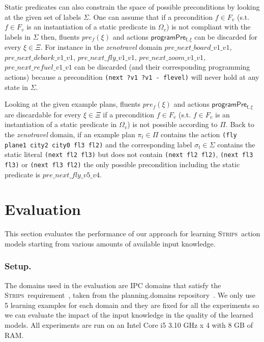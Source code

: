 \documentclass[letterpaper]{article} %
\newcommand{\strips}{\textsc{Strips}}     %
\begin{document}
Static predicates can also constrain the space of possible preconditions by looking at the given set of labels $\Sigma$. One can assume that if a precondition $f\in F_v$ (s.t. $f\in F_v$ is an instantiation of a static predicate in $\Omega_v$) is not compliant with the labels in $\Sigma$ then, fluents $pre_f(\xi)$ and actions $\mathsf{programPre_{f,\xi}}$ can be discarded for every $\xi\in\Xi$. For instance in the {\em zenotravel} domain $pre\_next\_board\_v1\_v1$, $pre\_next\_debark\_v1\_v1$, $pre\_next\_fly\_v1\_v1$, $pre\_next\_zoom\_v1\_v1$, $pre\_next\_refuel\_v1\_v1$ can be discarded (and their corresponding programming actions) because a precondition {\tt\small(next ?v1 ?v1 - flevel)} will never hold at any state in $\Sigma$.

Looking at the given example plans, fluents $pre_f(\xi)$ and actions $\mathsf{programPre_{f,\xi}}$ are discardable for every $\xi\in\Xi$ if a precondition $f\in F_v$ (s.t. $f\in F_v$ is an instantiation of a static predicate in $\Omega_v$) is not possible according to $\Pi$. Back to the {\em zenotravel} domain, if an example plan $\pi_t\in \Pi$ contains the action {\tt\small (fly plane1 city2 city0 fl3 fl2)} and the corresponding label $\sigma_t\in\Sigma$ contains the static literal {\tt\small (next fl2 fl3)} but does not contain {\tt\small (next fl2 fl2)}, {\tt\small (next fl3 fl3)} or {\tt\small (next fl3 fl2)} the only possible precondition including the static predicate is $pre\_next\_fly\_v5\_v4$.



\section{Evaluation}
This section evaluates the performance of our approach for learning \strips\ action models starting from various amounts of available input knowledge.

\subsubsection{Setup.}
The domains used in the evaluation are IPC domains that satisfy the \strips\ requirement~\cite{fox2003pddl2}, taken from the {\sc planning.domains} repository~\cite{muise2016planning}. We only use 5 learning examples for each domain and they are fixed for all the experiments so we can evaluate the impact of the input knowledge in the quality of the learned models. All experiments are run on an Intel Core i5 3.10 GHz x 4 with 8 GB of RAM.
\end{document}
